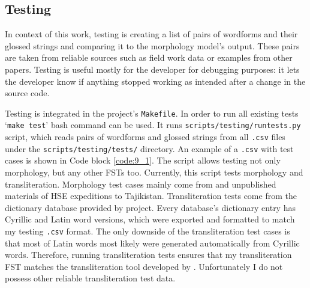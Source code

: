 \subsection{Testing} \label{testing_section}
In context of this work, testing is creating a list of pairs of wordforms and their glossed strings and comparing it to the morphology model's output. These pairs are taken from reliable sources such as field work data or examples from other papers. Testing is useful mostly for the developer for debugging purposes: it lets the developer know if anything stopped working as intended after a change in the source code. 

Testing is integrated in the project's \texttt{Makefile}. In order to run all existing tests `\texttt{make test}' bash command can be used. It runs \texttt{scripts/testing/runtests.py} script, which reads pairs of wordforms and glossed strings from all \texttt{.csv} files under the \texttt{scripts/testing/tests/} directory. An example of a \texttt{.csv} with test cases is shown in Code block \ref{code:9_1}. The script allows testing not only morphology, but any other FSTs too. Currently, this script tests morphology and transliteration. Morphology test cases mainly come from \textcite{parker_shughni_2023} and unpublished materials of HSE expeditions to Tajikistan. Transliteration tests come from the dictionary database provided by \textcite{makarov_digital_2022} project. Every database's dictionary entry has Cyrillic and Latin word versions, which were exported and formatted to match my testing \texttt{.csv} format. The only downside of the transliteration test cases is that most of Latin words most likely were generated automatically from Cyrillic words. Therefore, running transliteration tests ensures that my transliteration FST matches the transliteration tool developed by \textcite{makarov_digital_2022}. Unfortunately I do not possess other reliable transliteration test data.

